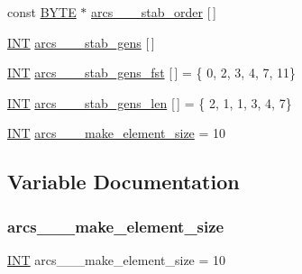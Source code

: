 \begin{DoxyCompactItemize}
\item 
const \mbox{\hyperlink{galois_8h_ab6cc7b4aeb6ea31aba2b3fbfc83ff5e6}{B\+Y\+TE}} $\ast$ \mbox{\hyperlink{data__hyperovals_8_c_a5226b7819bfacf2566e64ac339439e4e}{arcs\+\_\+\_\+\_\+stab\+\_\+order}} \mbox{[}$\,$\mbox{]}
\item 
\mbox{\hyperlink{galois_8h_a09fddde158a3a20bd2dcadb609de11dc}{I\+NT}} \mbox{\hyperlink{data__hyperovals_8_c_a25e6977c31325692de292c8b8c9d3fbe}{arcs\+\_\+\_\+\_\+stab\+\_\+gens}} \mbox{[}$\,$\mbox{]}
\item 
\mbox{\hyperlink{galois_8h_a09fddde158a3a20bd2dcadb609de11dc}{I\+NT}} \mbox{\hyperlink{data__hyperovals_8_c_a58232aa603daa8dfb0c7892e1ab44d8d}{arcs\+\_\+\_\+\_\+stab\+\_\+gens\+\_\+fst}} \mbox{[}$\,$\mbox{]} = \{ 0, 2, 3, 4, 7, 11\}
\item 
\mbox{\hyperlink{galois_8h_a09fddde158a3a20bd2dcadb609de11dc}{I\+NT}} \mbox{\hyperlink{data__hyperovals_8_c_a82240131adba4ec9aa22000030583016}{arcs\+\_\+\_\+\_\+stab\+\_\+gens\+\_\+len}} \mbox{[}$\,$\mbox{]} = \{ 2, 1, 1, 3, 4, 7\}
\item 
\mbox{\hyperlink{galois_8h_a09fddde158a3a20bd2dcadb609de11dc}{I\+NT}} \mbox{\hyperlink{data__hyperovals_8_c_a63ed210f5f021e63aa1f1f234d8c18e8}{arcs\+\_\+\_\+\_\+make\+\_\+element\+\_\+size}} = 10
\end{DoxyCompactItemize}


\subsection{Variable Documentation}
\mbox{\label{data__hyperovals_8_c_ac3422767c6027da27b351b259b0fd00f}} 
\subsubsection{\texorpdfstring{arcs\+\_\+\_\+\_\+make\+\_\+element\+\_\+size}{arcs\_16\_18\_make\_element\_size}}
{\footnotesize\ttfamily \mbox{\hyperlink{galois_8h_a09fddde158a3a20bd2dcadb609de11dc}{I\+NT}} arcs\+\_\+\_\+\_\+make\+\_\+element\+\_\+size = 10}

